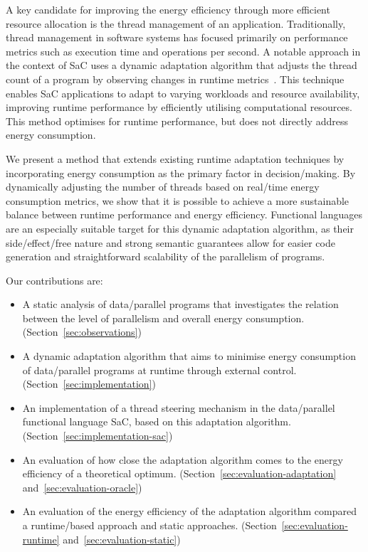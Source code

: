 A key candidate for improving the energy efficiency through more efficient resource allocation is the thread management of an application.
Traditionally, thread management in software systems has focused primarily on performance metrics such as execution time and operations per second.
A notable approach in the context of SaC uses a dynamic adaptation algorithm that adjusts the thread count of a program by observing changes in runtime metrics~\cite{gordon2015dynamic}.
This technique enables SaC applications to adapt to varying workloads and resource availability, improving runtime performance by efficiently utilising computational resources.
This method optimises for runtime performance, but does not directly address energy consumption.

We present a method that extends existing runtime adaptation techniques by incorporating energy consumption as the primary factor in decision\-/making.
By dynamically adjusting the number of threads based on real\-/time energy consumption metrics, we show that it is possible to achieve a more sustainable balance between runtime performance and energy efficiency.
Functional languages are an especially suitable target for this dynamic adaptation algorithm, as their side\-/effect\-/free nature and strong semantic guarantees allow for easier code generation and straightforward scalability of the parallelism of programs.

Our contributions are:
\begin{itemize}
  \item A static analysis of data\-/parallel programs that investigates the relation between the level of parallelism and overall energy consumption.
  (Section~\ref{sec:observations})
  \item A dynamic adaptation algorithm that aims to minimise energy consumption of data\-/parallel programs at runtime through external control.
  (Section~\ref{sec:implementation})
  \item An implementation of a thread steering mechanism in the data\-/parallel functional language SaC, based on this adaptation algorithm.
  (Section~\ref{sec:implementation-sac})
  \item An evaluation of how close the adaptation algorithm comes to the energy efficiency of a theoretical optimum.
  (Section~\ref{sec:evaluation-adaptation} and~\ref{sec:evaluation-oracle})
  \item An evaluation of the energy efficiency of the adaptation algorithm compared a runtime\-/based approach and static approaches.
  (Section~\ref{sec:evaluation-runtime} and~\ref{sec:evaluation-static})
\end{itemize}

